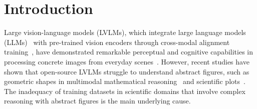\section{Introduction}
\label{sec:intro}

Large vision-language models (LVLMs), which integrate large language models (LLMs)~\citep{gpt3,touvron2023llama} with pre-trained vision encoders through cross-modal alignment training~\citep{madureira-2021-flamingos,liu2023llava,li2023m3it}, 
have demonstrated remarkable perceptual and cognitive capabilities in processing concrete images from everyday scenes~\citep{gpt4v,fu2023mme,yang2023dawn,reka2024core}.
However, recent studies have shown that open-source LVLMs struggle to understand abstract figures, such as geometric shapes in multimodal mathematical reasoning~\citep{mathvista,zhang2024mathverse} and scientific plots~\citep{mmmu}. 
The inadequacy of training datasets in scientific domains that involve complex reasoning with abstract figures is the main underlying cause.


